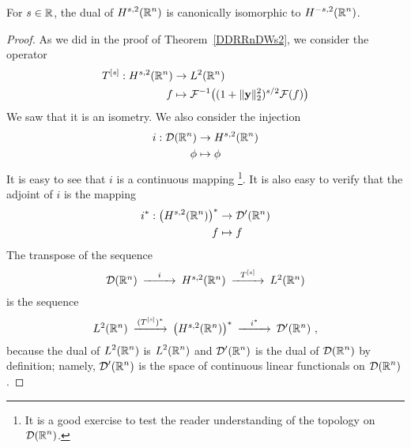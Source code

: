 \begin{prop}
For $\displaystyle s \in \mathbb{R}$, the dual of
$\displaystyle H^{s,2}(\mathbb{R}^n)$ is canonically isomorphic 
to $\displaystyle H^{-s,2}(\mathbb{R}^n)$.
\end{prop}

\begin{proof}
As we did in the proof of Theorem~\ref{DDRRnDWs2}, we consider the operator
\begin{align*}
T^{[s]} : H^{s,2}(\mathbb{R}^n) & \to L^2(\mathbb{R}^n) \\
f &\mapsto \mathcal{F}^{-1}\big((1+\|\mathbf{y}\|_2^2)^{s/2} \mathcal{F}(f) \big)  
\end{align*}
We saw that it is an isometry.  We also consider the injection
\begin{align*}
i : \mathcal{D}(\mathbb{R}^n) & \to H^{s,2}(\mathbb{R}^n) \\
\phi &\mapsto \phi
\end{align*}
It is easy to see that $i$ is a continuous mapping \footnote{It is a
good exercise to test the reader understanding of the topology on
$\displaystyle \mathcal{D}(\mathbb{R}^n)$.}.
It is also easy to verify that the adjoint of $i$ is the mapping
\begin{align*}
i^\ast : \big(H^{s,2}(\mathbb{R}^n)\big)^\ast & \to \mathcal{D}'(\mathbb{R}^n) \\
f &\mapsto f
\end{align*}
The transpose of the sequence
\[
\begin{CD}
\DD(\RR^n) @>i>> H^{s,2}(\RR^n) @>T^{[s]}>> L^2(\RR^n)
\end{CD}
\]
is the sequence
\[
\begin{CD}
L^2(\RR^n) @>(T^{[s]})^\ast>> \big(H^{s,2}(\RR^n)\big)^\ast @>i^\ast>>
 \DD'(\RR^n)  \ ,
\end{CD}
\]
because the dual of $\displaystyle L^2(\mathbb{R}^n)$ is $\displaystyle L^2(\mathbb{R}^n)$
and $\displaystyle \mathcal{D}'(\mathbb{R}^n)$ is the dual of
$\displaystyle \mathcal{D}(\mathbb{R}^n)$ by definition; namely,
$\displaystyle \mathcal{D}'(\mathbb{R}^n)$ is the space of continuous linear
functionals on $\displaystyle \mathcal{D}(\mathbb{R}^n)$.


\end{proof}
